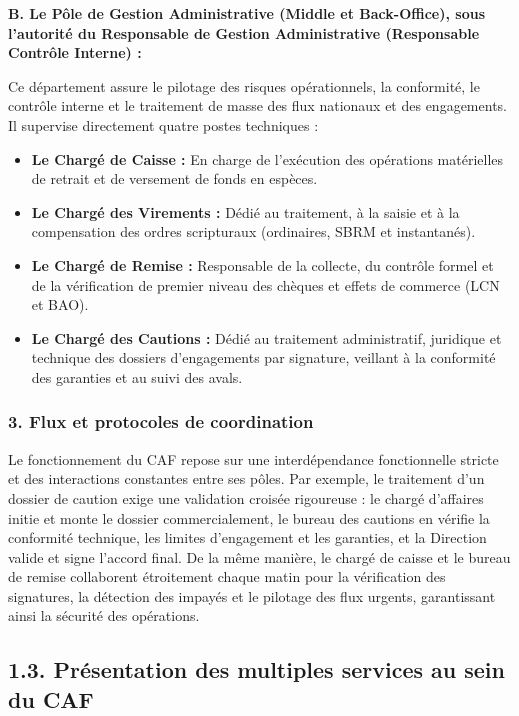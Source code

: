 \textbf{B. Le Pôle de Gestion Administrative (Middle et Back-Office), sous l'autorité du Responsable de Gestion Administrative (Responsable Contrôle Interne) :}

Ce département assure le pilotage des risques opérationnels, la conformité, le contrôle interne et le traitement de masse des flux nationaux et des engagements. Il supervise directement quatre postes techniques :

\begin{itemize}
  \item \textbf{Le Chargé de Caisse :} En charge de l'exécution des opérations matérielles de retrait et de versement de fonds en espèces.
  \item \textbf{Le Chargé des Virements :} Dédié au traitement, à la saisie et à la compensation des ordres scripturaux (ordinaires, SBRM et instantanés).
  \item \textbf{Le Chargé de Remise :} Responsable de la collecte, du contrôle formel et de la vérification de premier niveau des chèques et effets de commerce (LCN et BAO).
  \item \textbf{Le Chargé des Cautions :} Dédié au traitement administratif, juridique et technique des dossiers d'engagements par signature, veillant à la conformité des garanties et au suivi des avals.
\end{itemize}

\subsubsection*{3. Flux et protocoles de coordination}

Le fonctionnement du CAF repose sur une interdépendance fonctionnelle stricte et des interactions constantes entre ses pôles. Par exemple, le traitement d'un dossier de caution exige une validation croisée rigoureuse : le chargé d'affaires initie et monte le dossier commercialement, le bureau des cautions en vérifie la conformité technique, les limites d'engagement et les garanties, et la Direction valide et signe l'accord final. De la même manière, le chargé de caisse et le bureau de remise collaborent étroitement chaque matin pour la vérification des signatures, la détection des impayés et le pilotage des flux urgents, garantissant ainsi la sécurité des opérations.

\subsection*{1.3. Présentation des multiples services au sein du CAF}

